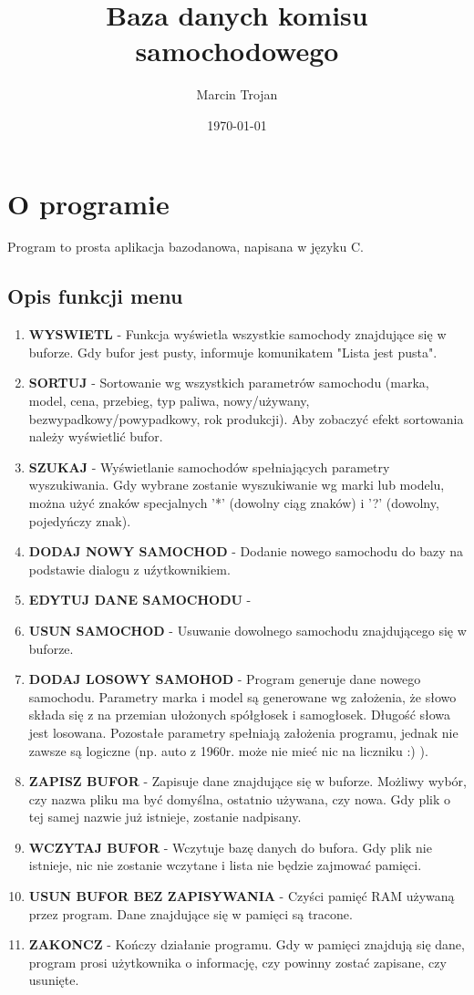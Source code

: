 \documentclass[a4paper,12pt]{article}
\title{Baza danych komisu samochodowego}
\author{Marcin Trojan}
\date{\today}
\begin{document}
\maketitle

\section{O programie}
Program to prosta aplikacja bazodanowa, napisana w języku C.

\subsection{Opis funkcji menu}

\begin{enumerate}
  \item \textbf{WYSWIETL} - Funkcja wyświetla wszystkie samochody znajdujące się w buforze. Gdy bufor jest pusty, informuje komunikatem "Lista jest pusta".
  
  \item \textbf{SORTUJ} - Sortowanie wg wszystkich parametrów samochodu (marka, model, cena, przebieg, typ paliwa, nowy/używany, bezwypadkowy/powypadkowy, rok produkcji). Aby zobaczyć efekt sortowania należy wyświetlić bufor.
  \item \textbf{SZUKAJ} - Wyświetlanie samochodów spełniających parametry wyszukiwania. Gdy wybrane zostanie wyszukiwanie wg marki lub modelu, można użyć znaków specjalnych '*' (dowolny ciąg znaków) i '?' (dowolny, pojedyńczy znak).
  \item \textbf{DODAJ NOWY SAMOCHOD} - Dodanie nowego samochodu do bazy na podstawie dialogu z uźytkownikiem.
  \item \textbf{EDYTUJ DANE SAMOCHODU} - 
  \item \textbf{USUN SAMOCHOD} - Usuwanie dowolnego samochodu znajdującego się w buforze.
  \item \textbf{DODAJ LOSOWY SAMOHOD} - Program generuje dane nowego samochodu. Parametry marka i model są generowane wg założenia, że słowo składa się z na przemian ułożonych spółgłosek i samogłosek. Długość słowa jest losowana. Pozostałe parametry spełniają założenia programu, jednak nie zawsze są logiczne (np. auto z 1960r. może nie mieć nic na liczniku :) ).
  \item \textbf{ZAPISZ BUFOR} - Zapisuje dane znajdujące się w buforze. Możliwy wybór, czy nazwa pliku ma być domyślna, ostatnio używana, czy nowa. Gdy plik o tej samej nazwie już istnieje, zostanie nadpisany.
  \item \textbf{WCZYTAJ BUFOR} - Wczytuje bazę danych do bufora. Gdy plik nie istnieje, nic nie zostanie wczytane i lista nie będzie zajmować pamięci.
  \item \textbf{USUN BUFOR BEZ ZAPISYWANIA} - Czyści pamięć RAM używaną przez program. Dane znajdujące się w pamięci są tracone.
  \item \textbf{ZAKONCZ} - Kończy działanie programu. Gdy w pamięci znajdują się dane, program prosi użytkownika o informację, czy powinny zostać zapisane, czy usunięte.

\end{enumerate} 
\end{document}
